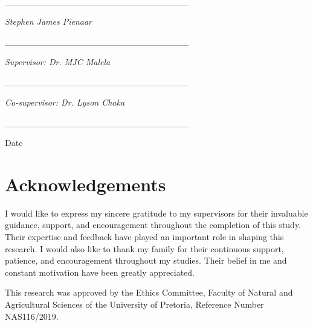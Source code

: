 \documentclass[english]{article}
\makeatletter
\let\thesis@listoffigures\listoffigures
\let\thesis@listoftables\listoftables
\renewcommand{\listoffigures}{\begingroup
  \renewcommand{\numberline}[1]{\hb@xt@\@tempdima{\figurename~##1\hfil}}%
  \thesis@listoffigures\endgroup}
\renewcommand{\listoftables}{\begingroup
  \renewcommand{\numberline}[1]{\hb@xt@\@tempdima{\tablename~##1\hfil}}%
  \thesis@listoftables\endgroup}
\makeatother
\begin{document}
\vspace{1cm}

\_\_\_\_\_\_\_\_\_\_\_\_\_\_\_\_\_\_\_\_\_\_\_\_\_\_\_\_\_

\emph{Stephen James Pienaar}

\vspace{1cm}

\_\_\_\_\_\_\_\_\_\_\_\_\_\_\_\_\_\_\_\_\_\_\_\_\_\_\_\_\_

\emph{Supervisor: Dr. MJC Malela}

\vspace{1cm}

\_\_\_\_\_\_\_\_\_\_\_\_\_\_\_\_\_\_\_\_\_\_\_\_\_\_\_\_\_

\emph{Co-supervisor: Dr. Lyson Chaka}

\vspace{1cm}

\_\_\_\_\_\_\_\_\_\_\_\_\_\_\_\_\_\_\_\_\_\_\_\_\_\_\_\_\_

Date 

\newpage{}

\section*{Acknowledgements}

I would like to express my sincere gratitude to my supervisors for their invaluable guidance, support, and encouragement throughout the completion of this study. Their expertise and feedback have played an important role in shaping this research. I would also like to thank my family for their continuous support, patience, and encouragement throughout my studies. Their belief in me and constant motivation have been greatly appreciated.

This research was approved by the Ethics Committee, Faculty of Natural and Agricultural Sciences of the University of Pretoria, Reference Number NAS116/2019.

\newpage{}

\tableofcontents{}

\listoffigures

\listoftables

\newpage{}







\label{body-end}
\end{document}
